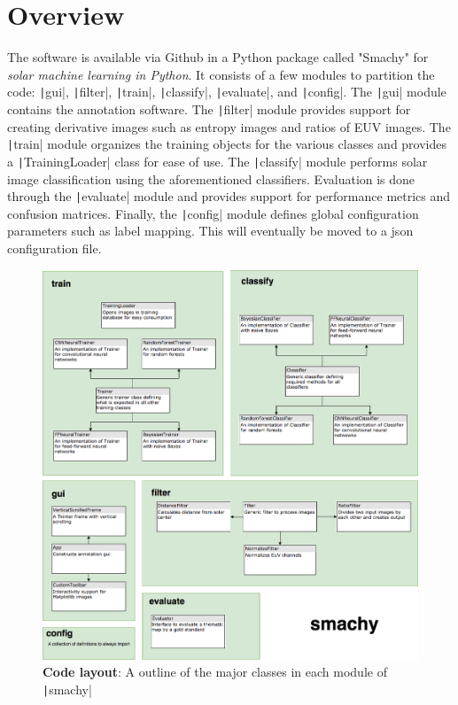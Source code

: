 \documentclass[twoside]{report}
\newcommand{\code}[1]{\texttt|#1|}
\begin{document}
\section{Overview}
The software is available via Github in a Python package called "Smachy" for \textit{solar machine learning in Python}. It consists of a few modules to partition the code: \code{gui}, \code{filter}, \code{train}, \code{classify}, \code{evaluate}, and \code{config}. The \code{gui} module contains the annotation software. The \code{filter} module provides support for creating derivative images such as entropy images and ratios of EUV images. The \code{train} module organizes the training objects for the various classes and provides a \code{TrainingLoader} class for ease of use. The \code{classify} module performs solar image classification using the aforementioned classifiers. Evaluation is done through the \code{evaluate} module and provides support for performance metrics and confusion matrices. Finally, the \code{config} module defines global configuration parameters such as label mapping. This will eventually be moved to a json configuration file. 

\begin{figure}[ht]
  \begin{center}
    \includegraphics[scale=0.3]{codebase}
    \caption{{\bf Code layout}: A outline of the major classes in each module of \code{smachy} }
    \label{fig:codebase}
 \end{center}
\end{figure}
\end{document}
